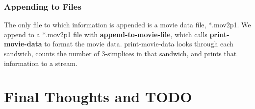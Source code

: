 \message{ !name(programmers_guide.tex)}\documentclass[12pt]{article}
\begin{document}
\subsubsection{Appending to Files}
\label{sec:output:appending-to-files}

The only file to which information is appended is a movie data file,
*.mov2p1. We append to a *.mov2p1 file with
\textbf{append-to-movie-file}, which calls \textbf{print-movie-data}
to format the movie data. print-movie-data looks through each
sandwich, counts the number of 3-simplices in that sandwich, and
prints that information to a stream. 

\section{Final Thoughts and TODO}
\end{document}
